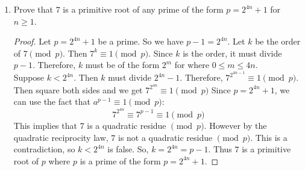 \documentclass[11pt]{article}
\theoremstyle{definition}
\begin{document}
\begin{enumerate}
    \item Prove that $7$ is a primitive root of any prime of the form $p=2^{4n} + 1$ for $n\geq 1$.
    \begin{proof}
        Let $p=2^{4n}+1$ be a prime. So we have $p-1 = 2^{4n}$.
        Let $k$ be the order of $7\pmod{p}$. Then $7^k\equiv 1\pmod{p}$.
        Since $k$ is the order, it must divide $p-1$. 
        Therefore, $k$ must be of the form 
        $2^m$ for where $0\le m\le 4n$. \\
        Suppose $k<2^{4n}$. Then $k$ must divide $2^{4n}-1$. 
        Therefore, $7^{2^{4n-1}}\equiv 1\pmod{p}$.
        Then square both sides and we get $7^{2^{4n}}\equiv 1\pmod{p}$
        Since $p=2^{4n}+1$, we can use the fact that $a^{p-1}\equiv 1\pmod{p}$:
        \[
            7^{2^{4n}}\equiv 7^{p-1}\equiv 1\pmod{p}
        \]
        This implies that $7$ is a quadratic residue $\pmod{p}$.
        However by the quadratic reciprocity law, $7$ is not a 
        quadratic residue $\pmod{p}$. This is a contradiction, so 
        $k<2^{4n}$ is false.
        So, $k=2^{4n}=p-1$. 
        Thus $7$ is a primitive root of $p$ where $p$ is a prime of the form
        $p=2^{4n}+1$.
    \end{proof}
    
\end{enumerate}
\end{document}
